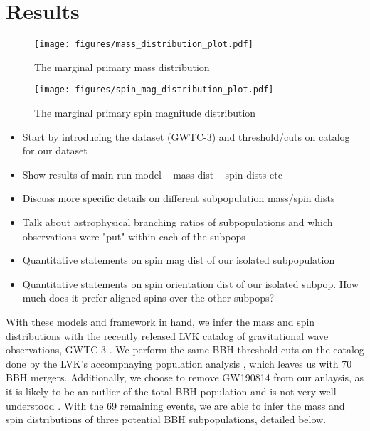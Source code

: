\section{Results} \label{sec:results}

\begin{figure*}[ht!]
    \begin{centering}
        \texttt{[image: figures/mass\_distribution\_plot.pdf]}
        \caption{The marginal primary mass distribution}
        \label{fig:mass_distribution}
    \end{centering}
\end{figure*}

\begin{figure*}[ht!]
    \begin{centering}
        \texttt{[image: figures/spin\_mag\_distribution\_plot.pdf]}
        \caption{The marginal primary spin magnitude distribution}
        \label{fig:spin_mag_distribution}
    \end{centering}
\end{figure*}

\begin{itemize}
    \item Start by introducing the dataset (GWTC-3) and threshold/cuts on catalog for our dataset
    \item Show results of main run model -- mass dist -- spin dists etc
    \item Discuss more specific details on different subpopulation mass/spin dists
    \item Talk about astrophysical branching ratios of subpopulations and which observations were "put" within each of the subpops
    \item Quantitative statements on spin mag dist of our isolated subpopulation
    \item Quantitative statements on spin orientation dist of our isolated subpop. How much does it prefer aligned spins over the other subpops?
\end{itemize}

With these models and framework in hand, we infer the mass and spin distributions with the recently released LVK catalog of gravitational wave observations, GWTC-3 . We perform the same BBH threshold cuts on the catalog done by the LVK's accompnaying population analysis , which leaves us with 70 BBH mergers. Additionally, we choose to remove GW190814 from our anlaysis, as it is likely to be an outlier of the total BBH population and is not very well understood . With the 69 remaining events, we are able to infer the mass and spin distributions of three potential BBH subpopulations, detailed below. 


